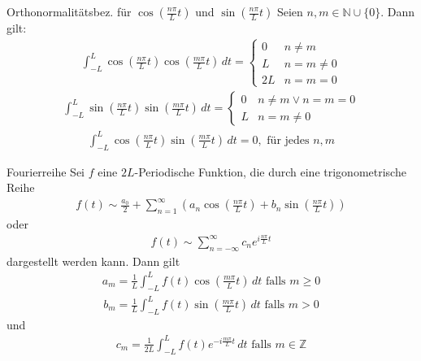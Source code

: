 \documentclass[a4paper,10pt]{article}
\begin{document}
\begin{subbox}{Orthonormalitätsbez. für $\cos(\frac{n\pi}{L}t)$ und $\sin(\frac{n\pi}{L}t)$}
  Seien \(n,m\in\mathbb{N}\cup\{0\}\). Dann gilt:
\begin{align*}\int_{-L}^L\cos\left(\frac{n\pi}{L}t\right)\cos\left(\frac{m\pi}{L}t\right)\,dt=\begin{cases}0&n\neq m\\L&n=m\neq0\\2L&n=m=0 \end{cases} \end{align*}
\begin{align*} \int_{-L}^L\sin\left(\frac{n\pi}{L}t\right)\sin\left(\frac{m\pi}{L}t\right)\,dt=\begin{cases}0&n\neq m \lor n = m = 0\\L&n=m\neq0 \end{cases} \end{align*}
\begin{align*} \int_{-L}^L\cos\left(\frac{n\pi}{L}t\right)\sin\left(\frac{m\pi}{L}t\right)\,dt=0, \text{ für jedes }n,m  \end{align*}

\end{subbox}

\begin{mainbox}{Fourierreihe}
  Sei \(f\) eine \(2L\)-Periodische Funktion, die durch eine trigonometrische Reihe \begin{align*} f(t)\sim \frac{a_0}{2}+\sum_{n=1}^\infty\left(a_n\cos\left(\frac{n\pi}{L}t\right)+b_n\sin\left(\frac{n\pi}{L}t\right)\right)  \end{align*} 
  oder 
  \begin{align*} f(t)\sim \sum_{n=-\infty}^\infty c_ne^{ i\frac{n\pi}{L}t} \end{align*} dargestellt werden kann. Dann gilt 
  \begin{align*} a_m=\frac{1}{L}\int_{-L}^Lf(t)\cos\left(\frac{m\pi}{L}t\right)\,dt \text{ falls } m\geq 0  \end{align*} \begin{align*} b_m=\frac{1}{L}\int_{-L}^Lf(t)\sin\left(\frac{m\pi}{L}t\right)\,dt \text{ falls } m>0  \end{align*} und \begin{align*} c_m=\frac{1}{2L}\int_{-L}^Lf(t)e^{- i \frac{m\pi}{L} t}\,dt \text{ falls } m\in\mathbb{Z}  \end{align*}
\end{mainbox}
\end{document}
